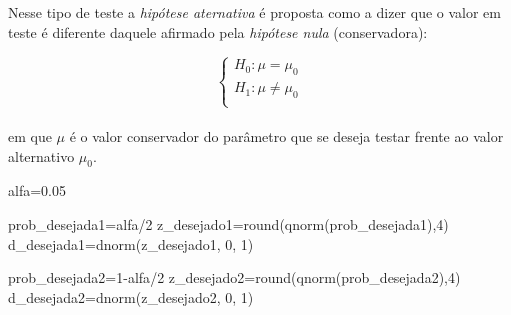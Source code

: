 \documentclass[
]{book}
\newenvironment{Shaded}{\begin{snugshade}}{\end{snugshade}}
\newcommand{\DecValTok}[1]{\textcolor[rgb]{0.00,0.00,0.81}{#1}}
\newcommand{\FloatTok}[1]{\textcolor[rgb]{0.00,0.00,0.81}{#1}}
\newcommand{\FunctionTok}[1]{\textcolor[rgb]{0.00,0.00,0.00}{#1}}
\newcommand{\NormalTok}[1]{#1}
\newcommand{\OtherTok}[1]{\textcolor[rgb]{0.56,0.35,0.01}{#1}}
\newcommand{\SpecialCharTok}[1]{\textcolor[rgb]{0.00,0.00,0.00}{#1}}
\begin{document}
Nesse tipo de teste a \emph{hipótese aternativa} é proposta como a dizer que o valor em teste é diferente daquele afirmado pela \emph{hipótese nula} (conservadora):

\hfill\break
\[
\begin{cases}
    H_{0}: \mu = \mu_{0}\\
    H_{1}: \mu \ne \mu_{0}\\
\end{cases}
\]\\

em que \(\mu\) é o valor conservador do parâmetro que se deseja testar frente ao valor alternativo \(\mu_{0}\).

\hfill\break

\begin{Shaded}
\begin{Highlighting}[]
\NormalTok{alfa}\OtherTok{=}\FloatTok{0.05}

\NormalTok{prob\_desejada1}\OtherTok{=}\NormalTok{alfa}\SpecialCharTok{/}\DecValTok{2}
\NormalTok{z\_desejado1}\OtherTok{=}\FunctionTok{round}\NormalTok{(}\FunctionTok{qnorm}\NormalTok{(prob\_desejada1),}\DecValTok{4}\NormalTok{)}
\NormalTok{d\_desejada1}\OtherTok{=}\FunctionTok{dnorm}\NormalTok{(z\_desejado1, }\DecValTok{0}\NormalTok{, }\DecValTok{1}\NormalTok{)}

\NormalTok{prob\_desejada2}\OtherTok{=}\DecValTok{1}\SpecialCharTok{{-}}\NormalTok{alfa}\SpecialCharTok{/}\DecValTok{2}
\NormalTok{z\_desejado2}\OtherTok{=}\FunctionTok{round}\NormalTok{(}\FunctionTok{qnorm}\NormalTok{(prob\_desejada2),}\DecValTok{4}\NormalTok{)}
\NormalTok{d\_desejada2}\OtherTok{=}\FunctionTok{dnorm}\NormalTok{(z\_desejado2, }\DecValTok{0}\NormalTok{, }\DecValTok{1}\NormalTok{)}




\end{Highlighting}
\end{Shaded}
\end{document}
